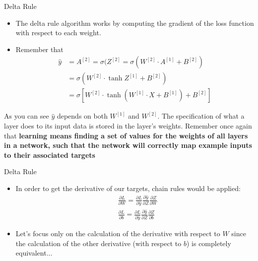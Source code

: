 \documentclass[11pt]{beamer}
\begin{document}
\begin{frame}{Delta Rule}
\begin{itemize}
\item The delta rule algorithm works by computing the gradient of the loss function with respect to each weight. 
\item Remember that
\begin{align*}
\hat y &= A^{[2]} = \sigma(Z^{[2]} = \sigma \left( W^{[2]} \cdot A^{[1]} + B^{[2]} \right) \\
&= \sigma \left( W^{[2]} \cdot \tanh{Z^{[1]}} + B^{[2]} \right) \\
&= \sigma \left[ W^{[2]} \cdot \tanh\left( W^{[1]} \cdot X + B^{[1]} \right) + B^{[2]} \right]
\end{align*}
\end{itemize}
\begin{tcolorbox}
As you can see $\hat y$ depends on both $W^{[1]}$ and $W^{[2]}$. The specification of what a layer does to its input data is stored in the layer's weights. Remember once again that \textbf{learning means finding a set of values for the weights of all layers in a network, such that the network will correctly map example inputs to their associated targets} 
\end{tcolorbox}
\end{frame}
\begin{frame}{Delta Rule}
\begin{itemize}
\item In order to get the derivative of our targets, chain rules would be applied:
\begin{align*}
&\frac{\partial L}{\partial W} =  \frac{\partial L}{\partial \hat y} \frac{\partial \hat y}{\partial Z} \frac{\partial Z}{\partial W} \\
&\frac{\partial L}{\partial b} =  \frac{\partial L}{\partial \hat y} \frac{\partial \hat y}{\partial Z} \frac{\partial Z}{\partial b} 
\end{align*}
\item Let's focus only on the calculation of the derivative with respect to $W$ since the calculation of the other derivative (with respect to $b$) is completely equivalent...
\end{itemize}
\end{frame}
\end{document}
